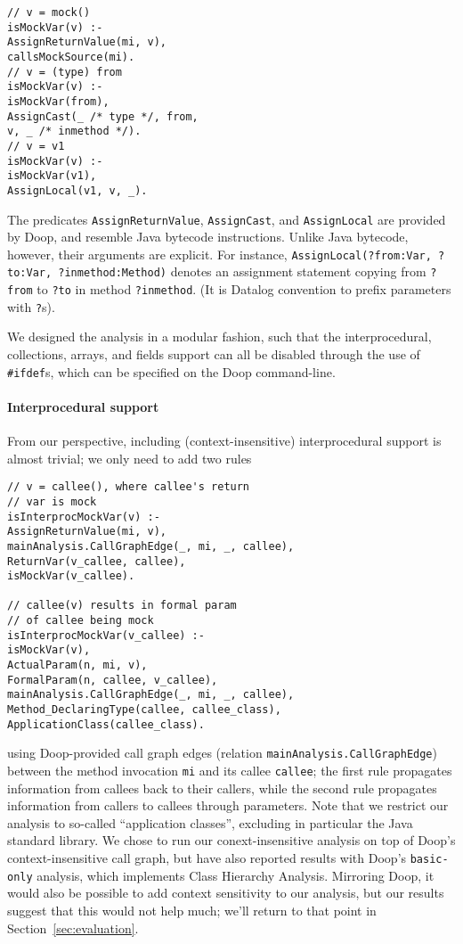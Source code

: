 \begin{lstlisting}[basicstyle=\ttfamily\small,numbers=none,label={lst:core}]
// v = mock()
isMockVar(v) :-
AssignReturnValue(mi, v),
callsMockSource(mi).
// v = (type) from
isMockVar(v) :-
isMockVar(from),
AssignCast(_ /* type */, from,
v, _ /* inmethod */).
// v = v1
isMockVar(v) :-
isMockVar(v1),
AssignLocal(v1, v, _).
\end{lstlisting}

The predicates \texttt{AssignReturnValue}, \texttt{AssignCast}, and \texttt{AssignLocal} are provided by Doop, and resemble Java bytecode instructions. Unlike Java bytecode, however, their arguments are explicit. For instance, \texttt{AssignLocal(?from:Var, ?to:Var, ?inmethod:Method)} denotes an assignment statement copying from \texttt{?from} to \texttt{?to} in method \texttt{?inmethod}. (It is Datalog convention to prefix parameters with \texttt{?}s).

We designed the analysis in a modular fashion, such that the interprocedural, collections, arrays, and fields support can all be disabled through the use of \verb+#ifdef+s, which can be specified on the Doop command-line.

\paragraph{Interprocedural support} From our perspective, including (context-insensitive) interprocedural support is almost trivial; we only need to add two rules
\begin{lstlisting}[basicstyle=\ttfamily\small,numbers=none]
// v = callee(), where callee's return 
// var is mock
isInterprocMockVar(v) :-
AssignReturnValue(mi, v),
mainAnalysis.CallGraphEdge(_, mi, _, callee),
ReturnVar(v_callee, callee),
isMockVar(v_callee).

// callee(v) results in formal param 
// of callee being mock
isInterprocMockVar(v_callee) :-
isMockVar(v),
ActualParam(n, mi, v),
FormalParam(n, callee, v_callee),
mainAnalysis.CallGraphEdge(_, mi, _, callee),
Method_DeclaringType(callee, callee_class),
ApplicationClass(callee_class).
\end{lstlisting}
using Doop-provided call graph edges (relation \texttt{mainAnalysis.CallGraphEdge}) between the method invocation {\tt mi} and its callee {\tt callee}; the first rule propagates information from callees back to their callers, while the second rule propagates information from callers to callees through parameters. Note that we restrict our analysis to so-called ``application classes'', excluding in particular the Java standard library. We chose to run our conext-insensitive analysis on top of Doop's context-insensitive call graph, but have also reported results with Doop's \texttt{basic-only} analysis, which implements Class Hierarchy Analysis. Mirroring Doop, it would also be possible to add context sensitivity to our analysis, but our results suggest that this would not help much; we'll return to that point in Section~\ref{sec:evaluation}.

